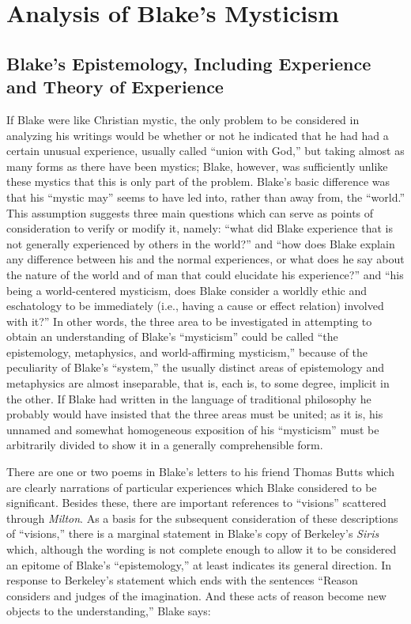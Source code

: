 \chapter{Analysis of Blake's Mysticism}

\section{Blake's Epistemology, Including Experience and Theory of Experience}

If Blake were like Christian mystic, the only problem to be considered in analyzing his
writings would be whether or not he indicated that he had had a certain unusual experience,
usually called \enquote{union with God,} but taking almost as many forms as there have been mystics; Blake, however,
was sufficiently unlike these mystics that this is only part of the problem. Blake's basic difference was that
his \enquote{mystic may} seems to have led into, rather than away from, the \enquote{world.} This assumption
suggests three main questions which can serve as points of consideration to verify
or modify it, namely: \enquote{what did Blake experience that is not generally experienced by others in the world?}
and \enquote{how does Blake explain any difference between his and the normal experiences, or what does he say about the
nature of the world and of man that could elucidate his experience?} and \enquote{his being a world-centered mysticism,
does Blake consider a worldly ethic and eschatology to be immediately (i.e., having a cause or effect relation) involved
with it?} In other words, the three area to be investigated in attempting to obtain an understanding of
Blake's \enquote{mysticism} could be called \enquote{the epistemology, metaphysics, and world-affirming
mysticism,} because of the peculiarity of Blake's \enquote{system,} the usually distinct
areas of epistemology and metaphysics are almost inseparable, that is, each is, to some degree,
implicit in the other. If Blake had written in the language of traditional philosophy
he probably would have insisted that the three areas must be united; as it is, his unnamed and somewhat
homogeneous exposition of his \enquote{mysticism} must be arbitrarily divided to show it in a generally comprehensible form.

There are one or two poems in Blake's letters to his friend Thomas Butts which are clearly narrations of particular
experiences which Blake considered to be significant. Besides these, there are important references to \enquote{visions} scattered
through \emph{Milton}. As a basis for the subsequent consideration of these descriptions of \enquote{visions,} there is
a marginal statement in Blake's copy of Berkeley's \emph{Siris} which, although the wording
is not complete enough to allow it to be considered an epitome of Blake's \enquote{epistemology,} at least
indicates its general direction. In response to Berkeley's statement which ends with the sentences
\enquote{Reason considers and judges of the imagination. And these acts of reason become new objects to the understanding,} Blake says:

